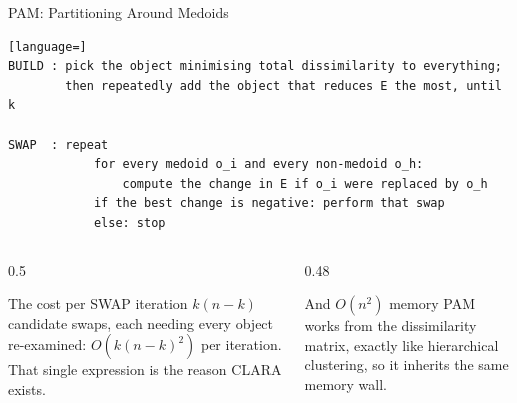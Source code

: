 \documentclass[aspectratio=169]{beamer}
\begin{document}
\begin{frame}[fragile,shrink=10]{PAM: Partitioning Around Medoids}
\begin{lstlisting}[language=]
BUILD : pick the object minimising total dissimilarity to everything;
        then repeatedly add the object that reduces E the most, until k

SWAP  : repeat
            for every medoid o_i and every non-medoid o_h:
                compute the change in E if o_i were replaced by o_h
            if the best change is negative: perform that swap
            else: stop
\end{lstlisting}
  \begin{columns}[T]
    \begin{column}{0.5\textwidth}
      \begin{exampleblock}{The cost per SWAP iteration}
        \small $k(n-k)$ candidate swaps, each needing every object
        re-examined: \textbf{$O(k(n-k)^2)$} per iteration. That single
        expression is the reason CLARA exists.
      \end{exampleblock}
    \end{column}
    \begin{column}{0.48\textwidth}
      \begin{alertblock}{And $O(n^2)$ memory}
        \small PAM works from the dissimilarity matrix, exactly like
        hierarchical clustering, so it inherits the same memory wall.
      \end{alertblock}
    \end{column}
  \end{columns}
\end{frame}
\end{document}
